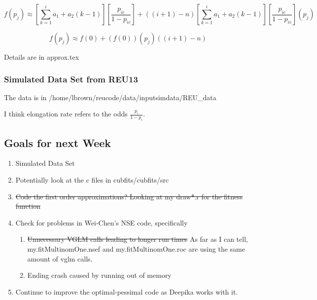 \documentclass[11pt]{article} %
\begin{document}
$$
f(p_j) \approx
\left[\sum_{k=1}^{i} a_1 + a_2(k-1)\right]
\left[\frac{p_{ic}}{1-p_{ic}}\right]
+
\left( (i+1) - n \right)
\left[\sum_{k=1}^{i} a_1 + a_2(k-1)\right]
\left[\frac{p_{ic}}{1-p_{ic}}\right]
\left( p_{j} \right)
$$

$$
f(p_j) \approx
f(0) + (f(0))(p_j)((i+1)-n)
$$


Details are in approx.tex


\subsubsection{Simulated Data Set from REU13}
The data is in /home/lbrown/reucode/data/inputsimdata/REU\_data

I think elongation rate refers to the odds $\frac{p_i}{1-p_i}$.



\subsection{Goals for next Week}
\begin{enumerate}
\item Simulated Data Set
\item Potentially look at the c files in cubfits/cubfits/src
\item \sout{Code the first order approximations? Looking at my draw*.r for the fitness function}
\item Check for problems in Wei-Chen's NSE code, specifically
\begin{enumerate}
\item \sout{Unnecessary VGLM calls leading to longer run times} As far as I can tell, my.fitMultinomOne.nsef and my.fitMultinomOne.roc are using the same amount of vglm calls.
\item Ending crash caused by running out of memory
\end{enumerate}

\item Continue to improve the optimal-pessimal code as Deepika works with it.
\end{enumerate}
\end{document}
